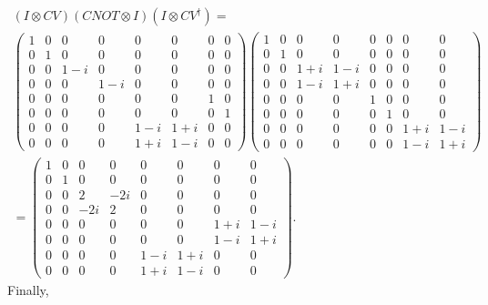 \documentclass[10pt]{article}
\begin{document}
\begin{align*}
(I \otimes CV)(CNOT \otimes I)(I \otimes CV^{\dag}) = \\ 
\begin{pmatrix}
1 & 0 & 0      & 0    & 0   & 0    & 0 & 0 \\
0 & 1 & 0      & 0    & 0   & 0    & 0 & 0 \\
0 & 0 & 1 - i & 0    & 0    & 0    & 0 & 0 \\
0 & 0 & 0      & 1-i & 0    & 0    & 0 & 0 \\
0 & 0 & 0      & 0    & 0    & 0    & 1 & 0 \\
0 & 0 & 0      & 0    & 0    & 0    & 0 & 1 \\
0 & 0 & 0      & 0    & 1-i & 1+i & 0 & 0 \\
0 & 0 & 0      & 0    & 1+i & 1-i & 0 & 0 
\end{pmatrix}
\begin{pmatrix}
1 & 0 & 0 & 0 & 0 & 0 & 0 & 0 \\
0 & 1 & 0 & 0 & 0 & 0 & 0 & 0 \\
0 & 0 & 1 + i & 1 - i & 0 & 0 & 0 & 0 \\
0 & 0 & 1 - i & 1 + i & 0 & 0 & 0 & 0 \\
\hline
0 & 0 & 0 & 0 & 1 & 0 & 0 & 0 \\
0 & 0 & 0 & 0 & 0 & 1 & 0 & 0 \\
0 & 0 & 0 & 0 & 0 & 0 & 1+i & 1-i \\
0 & 0 & 0 & 0 & 0 & 0 & 1-i & 1+i
\end{pmatrix} \\
=
\begin{pmatrix}
1 & 0 & 0    & 0      & 0    & 0 & 0     & 0 \\
0 & 1 & 0    & 0      & 0    & 0 & 0     & 0 \\
0 & 0 & 2    & -2i    & 0    & 0 & 0     & 0 \\
0 & 0 & -2i & 2       & 0    & 0 & 0     & 0 \\
0 & 0 & 0    & 0       & 0    & 0 & 1+i & 1-i \\
0 & 0 & 0    & 0       & 0    & 0 & 1-i  & 1+ i \\
0 & 0 & 0    & 0       & 1-i & 1+i & 0 & 0 \\
0 & 0 & 0    & 0       & 1+i & 1-i & 0 & 0 
\end{pmatrix}.
\end{align*}
Finally,
\end{document}
